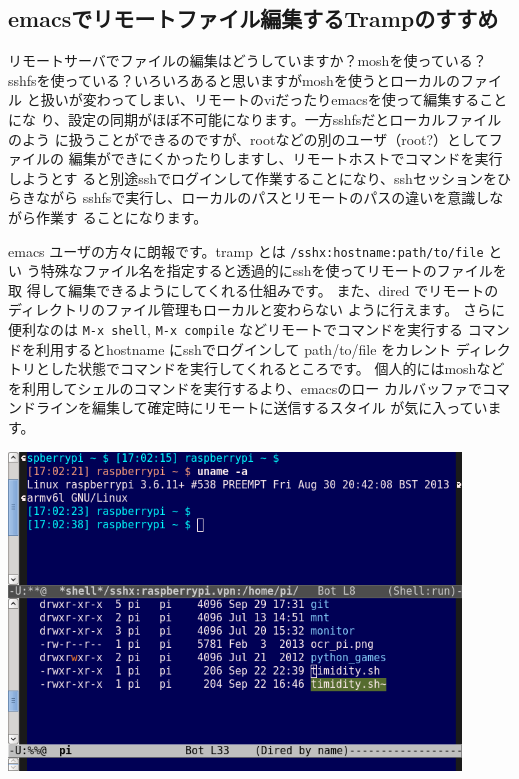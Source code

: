 \documentclass[mingoth,a4paper]{jsarticle}
\begin{document}

\subsection{emacsでリモートファイル編集するTrampのすすめ}

リモートサーバでファイルの編集はどうしていますか？moshを使っている？
sshfsを使っている？いろいろあると思いますがmoshを使うとローカルのファイル
と扱いが変わってしまい、リモートのviだったりemacsを使って編集することにな
り、設定の同期がほぼ不可能になります。一方sshfsだとローカルファイルのよう
に扱うことができるのですが、rootなどの別のユーザ（root?）としてファイルの
編集ができにくかったりしますし、リモートホストでコマンドを実行しようとす
ると別途sshでログインして作業することになり、sshセッションをひらきながら
sshfsで実行し、ローカルのパスとリモートのパスの違いを意識しながら作業す
ることになります。

emacs ユーザの方々に朗報です。tramp とは \texttt{/sshx:hostname:path/to/file} とい
う特殊なファイル名を指定すると透過的にsshを使ってリモートのファイルを取
得して編集できるようにしてくれる仕組みです。
また、dired でリモートのディレクトリのファイル管理もローカルと変わらない
ように行えます。
さらに便利なのは \texttt{M-x shell}, \texttt{M-x compile} などリモートでコマンドを実行する
コマンドを利用するとhostname にsshでログインして path/to/file をカレント
ディレクトリとした状態でコマンドを実行してくれるところです。
個人的にはmoshなどを利用してシェルのコマンドを実行するより、emacsのロー
カルバッファでコマンドラインを編集して確定時にリモートに送信するスタイル
が気に入っています。

\includegraphics[width=12cm]{image201311/tramp-screenshot.png}
\end{document}
